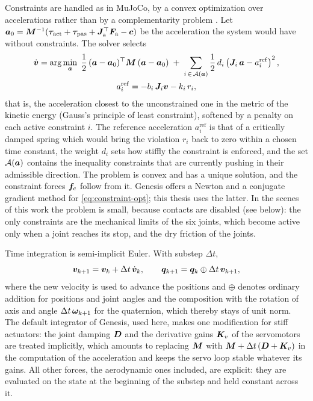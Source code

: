 Constraints are handled as in MuJoCo, by a convex optimization over accelerations rather than by a complementarity problem \cite{todorov2014convex}. Let $\bm{a}_0 = \bm{M}^{-1}(\bm{\tau}_{\mathrm{act}} + \bm{\tau}_{\mathrm{pas}} + \bm{J}_{\mathrm{a}}^{\top} \bm{F}_{\mathrm{a}} - \bm{c})$ be the acceleration the system would have without constraints. The solver selects
\begin{equation}
\begin{gathered}
\dot{\bm{v}} = \arg\min_{\bm{a}}\; \frac{1}{2}\,(\bm{a} - \bm{a}_0)^{\top} \bm{M}\, (\bm{a} - \bm{a}_0) \;+\; \sum_{i \,\in\, \mathcal{A}(\bm{a})} \frac{1}{2}\, d_i \left( \bm{J}_i\, \bm{a} - a_i^{\mathrm{ref}} \right)^2, \\
a_i^{\mathrm{ref}} = -b_i\, \bm{J}_i \bm{v} - k_i\, r_i ,
\end{gathered}
\label{eq:constraint-opt}
\end{equation}
that is, the acceleration closest to the unconstrained one in the metric of the kinetic energy (Gauss's principle of least constraint), softened by a penalty on each active constraint $i$. The reference acceleration $a_i^{\mathrm{ref}}$ is that of a critically damped spring which would bring the violation $r_i$ back to zero within a chosen time constant, the weight $d_i$ sets how stiffly the constraint is enforced, and the set $\mathcal{A}(\bm{a})$ contains the inequality constraints that are currently pushing in their admissible direction. The problem is convex and has a unique solution, and the constraint forces $\bm{f}_{\mathrm{c}}$ follow from it. Genesis offers a Newton and a conjugate gradient method for \eqref{eq:constraint-opt}; this thesis uses the latter. In the scenes of this work the problem is small, because contacts are disabled (see below): the only constraints are the mechanical limits of the six joints, which become active only when a joint reaches its stop, and the dry friction of the joints.

Time integration is semi-implicit Euler. With substep $\Delta t$,
\begin{equation}
\bm{v}_{k+1} = \bm{v}_k + \Delta t\, \dot{\bm{v}}_k, \qquad \bm{q}_{k+1} = \bm{q}_k \oplus \Delta t\, \bm{v}_{k+1},
\label{eq:integration}
\end{equation}
where the new velocity is used to advance the positions and $\oplus$ denotes ordinary addition for positions and joint angles and the composition with the rotation of axis and angle $\Delta t\,\bm{\omega}_{k+1}$ for the quaternion, which thereby stays of unit norm. The default integrator of Genesis, used here, makes one modification for stiff actuators: the joint damping $\bm{D}$ and the derivative gains $\bm{K}_v$ of the servomotors are treated implicitly, which amounts to replacing $\bm{M}$ with $\bm{M} + \Delta t\,(\bm{D} + \bm{K}_v)$ in the computation of the acceleration and keeps the servo loop stable whatever its gains. All other forces, the aerodynamic ones included, are explicit: they are evaluated on the state at the beginning of the substep and held constant across it.

